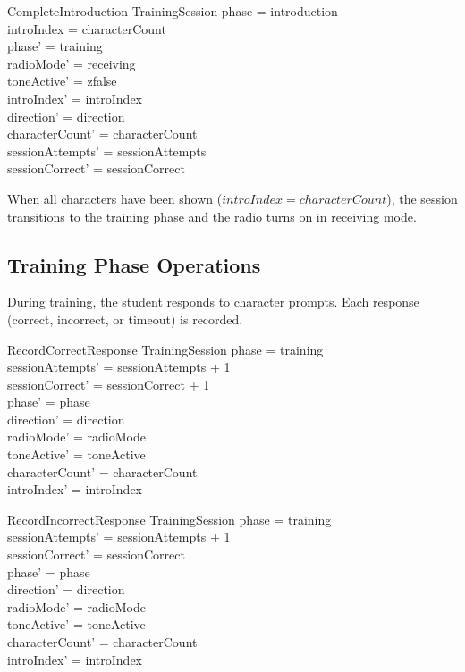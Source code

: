 \documentclass[a4paper,10pt,fleqn]{article}
\begin{document}
\begin{schema}{CompleteIntroduction}
\Delta TrainingSession
\where
phase = introduction \\
introIndex = characterCount \\
phase' = training \\
radioMode' = receiving \\
toneActive' = zfalse \\
introIndex' = introIndex \\
direction' = direction \\
characterCount' = characterCount \\
sessionAttempts' = sessionAttempts \\
sessionCorrect' = sessionCorrect
\end{schema}

When all characters have been shown ($introIndex = characterCount$), the
session transitions to the training phase and the radio turns on in receiving mode.

\subsection{Training Phase Operations}

During training, the student responds to character prompts. Each response
(correct, incorrect, or timeout) is recorded.

\begin{schema}{RecordCorrectResponse}
\Delta TrainingSession
\where
phase = training \\
sessionAttempts' = sessionAttempts + 1 \\
sessionCorrect' = sessionCorrect + 1 \\
phase' = phase \\
direction' = direction \\
radioMode' = radioMode \\
toneActive' = toneActive \\
characterCount' = characterCount \\
introIndex' = introIndex
\end{schema}

\begin{schema}{RecordIncorrectResponse}
\Delta TrainingSession
\where
phase = training \\
sessionAttempts' = sessionAttempts + 1 \\
sessionCorrect' = sessionCorrect \\
phase' = phase \\
direction' = direction \\
radioMode' = radioMode \\
toneActive' = toneActive \\
characterCount' = characterCount \\
introIndex' = introIndex
\end{schema}
\end{document}
